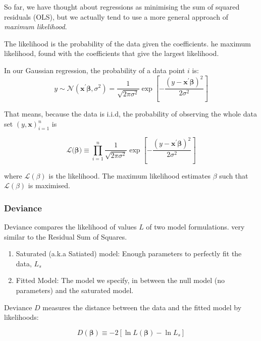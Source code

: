\documentclass[11pt]{article}
\begin{document}
So far, we have thought about regressions as minimising the sum of squared residuals (OLS), but we actually tend to use a more general approach of \textit{maximum likelihood}. 

The likelihood is the probability of the data given the coefficients. he maximum likelihood, found with the coefficients that give the largest likelihood.

In our Gaussian regression, the probability of a data point $i$ is:
\begin{equation*}
    y \sim \mathcal{N}(\mathbf{x^\prime\beta}, \sigma^2) = \dfrac{1}{\sqrt{2\pi\sigma^2}}\exp\left[-\dfrac{(y - \mathbf{x^\prime\beta})^2}{2\sigma^2}\right]
\end{equation*}

That means, because the data is i.i.d, the probability of observing the whole data set $(y,\mathbf{x})_{i=1}^n$ is

\begin{equation}
\label{eq:likelihood normal}
\mathcal{L(\mathbf{\beta}}) \equiv \prod_{i=1}^n \dfrac{1}{\sqrt{2\pi\sigma^2}}\exp\left[-\dfrac{(y - \mathbf{x^\prime\beta})^2}{2\sigma^2}\right]
\end{equation}

where $\mathcal{L(\beta)}$ is the likelihood. The maximum likelihood estimates $\beta$ such that $\mathcal{L(\beta)}$ is maximised.

\subsubsection{Deviance}

Deviance compares the likelihood of values $L$ of two model formulations. very similar to the Residual Sum of Squares.
\begin{enumerate}
    \item Saturated (a.k.a Satiated) model: Enough parameters to perfectly fit the data, $L_s$
    \item Fitted Model: The model we specify, in between the null model (no parameters) and the saturated model.
\end{enumerate}

Deviance $D$ measures the distance between the data and the fitted model by likelihoods:

\begin{equation}
    \label{eq: dev}
    D(\bm{\beta}) \equiv - 2[\ln L(\bm{\beta}) - \ln L_s]
\end{equation}
\end{document}
